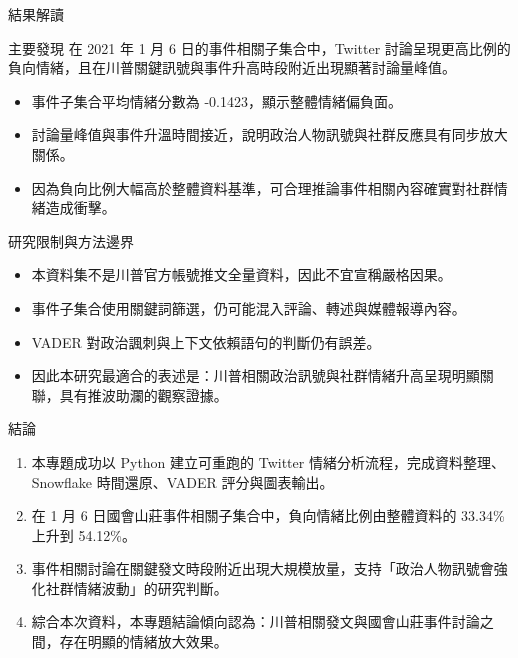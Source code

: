 \documentclass[aspectratio=169]{ctexbeamer}
\begin{document}
\begin{frame}{結果解讀}
\begin{block}{主要發現}
在 2021 年 1 月 6 日的事件相關子集合中，Twitter 討論呈現更高比例的負向情緒，且在川普關鍵訊號與事件升高時段附近出現顯著討論量峰值。
\end{block}

\vspace{0.6em}
\begin{itemize}
  \item 事件子集合平均情緒分數為 -0.1423，顯示整體情緒偏負面。
  \item 討論量峰值與事件升溫時間接近，說明政治人物訊號與社群反應具有同步放大關係。
  \item 因為負向比例大幅高於整體資料基準，可合理推論事件相關內容確實對社群情緒造成衝擊。
\end{itemize}
\end{frame}

\begin{frame}{研究限制與方法邊界}
\begin{itemize}
  \item 本資料集不是川普官方帳號推文全量資料，因此不宜宣稱嚴格因果。
  \item 事件子集合使用關鍵詞篩選，仍可能混入評論、轉述與媒體報導內容。
  \item VADER 對政治諷刺與上下文依賴語句的判斷仍有誤差。
  \item 因此本研究最適合的表述是：川普相關政治訊號與社群情緒升高呈現明顯關聯，具有推波助瀾的觀察證據。
\end{itemize}
\end{frame}

\begin{frame}{結論}
\begin{enumerate}
  \item 本專題成功以 Python 建立可重跑的 Twitter 情緒分析流程，完成資料整理、Snowflake 時間還原、VADER 評分與圖表輸出。
  \item 在 1 月 6 日國會山莊事件相關子集合中，負向情緒比例由整體資料的 33.34\% 上升到 54.12\%。
  \item 事件相關討論在關鍵發文時段附近出現大規模放量，支持「政治人物訊號會強化社群情緒波動」的研究判斷。
  \item 綜合本次資料，本專題結論傾向認為：川普相關發文與國會山莊事件討論之間，存在明顯的情緒放大效果。
\end{enumerate}
\end{frame}
\end{document}
